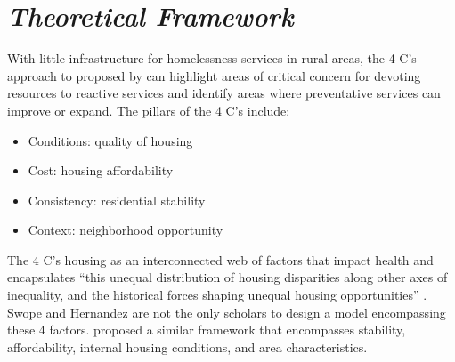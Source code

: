 \section{\textit{Theoretical Framework}}
With little infrastructure for homelessness services in rural areas, the 4 C’s approach to \hs proposed by \citet{swope_housing_2020} can highlight areas of critical concern for devoting resources to reactive services and identify areas where preventative services can improve or expand. The pillars of the 4 C's include:
\begin{itemize}
    \item{Conditions: quality of housing}
    \item{Cost: housing affordability}
    \item{Consistency: residential stability}
    \item{Context: neighborhood opportunity }
\end{itemize}
The 4 C’s housing as an interconnected web of factors that impact health and encapsulates “this unequal distribution of housing disparities along other axes of inequality, and the historical forces shaping unequal housing opportunities” \citep[1]{hernandez_housing_2019}. Swope and Hernandez are not the only scholars to design a model encompassing these 4 factors. \citet{metzger_fair_2017} proposed a similar framework that encompasses stability, affordability, internal housing conditions, and area characteristics. 



